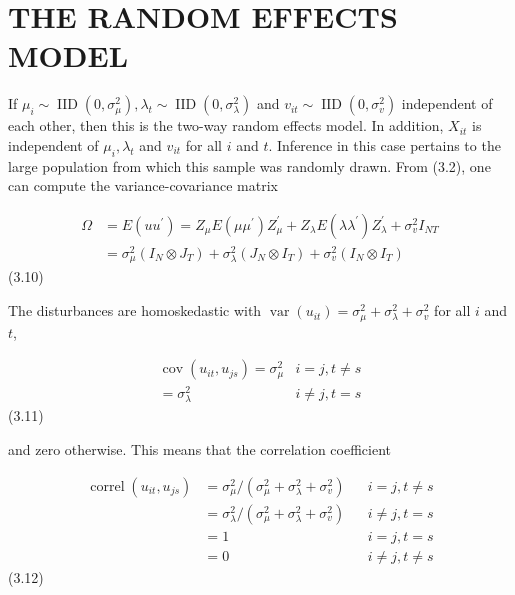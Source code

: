 \documentclass[
]{book}
\begin{document}
\hypertarget{the-random-effects-model-1}{%
\section{THE RANDOM EFFECTS MODEL}\label{the-random-effects-model-1}}

If \(\mu_{i} \sim \operatorname{IID}\left(0, \sigma_{\mu}^{2}\right), \lambda_{t} \sim \operatorname{IID}\left(0, \sigma_{\lambda}^{2}\right)\) and \(v_{i t} \sim \operatorname{IID}\left(0, \sigma_{v}^{2}\right)\) independent of each other, then this
is the two-way random effects model. In addition, \(X_{i t}\) is independent of \(\mu_{i}, \lambda_{t}\) and \(v_{i t}\) for all \(i\) and \(t\). Inference in this case pertains to the large population from which this sample was randomly drawn. From (3.2), one can compute the variance-covariance matrix

\begin{equation}
\begin{aligned}
\Omega &=E\left(u u^{\prime}\right)=Z_{\mu} E\left(\mu \mu^{\prime}\right) Z_{\mu}^{\prime}+Z_{\lambda} E\left(\lambda \lambda^{\prime}\right) Z_{\lambda}^{\prime}+\sigma_{v}^{2} I_{N T} \\
&=\sigma_{\mu}^{2}\left(I_{N} \otimes J_{T}\right)+\sigma_{\lambda}^{2}\left(J_{N} \otimes I_{T}\right)+\sigma_{v}^{2}\left(I_{N} \otimes I_{T}\right)
\end{aligned}
\end{equation} (3.10)

The disturbances are homoskedastic with \(\operatorname{var}\left(u_{i t}\right)=\sigma_{\mu}^{2}+\sigma_{\lambda}^{2}+\sigma_{v}^{2}\) for all \(i\) and \(t\),

\begin{equation}
\begin{array}{rl}
\operatorname{cov}\left(u_{i t}, u_{j s}\right)=\sigma_{\mu}^{2} & i=j, t \neq s \\
=\sigma_{\lambda}^{2} & i \neq j, t=s
\end{array}
\end{equation} (3.11)

and zero otherwise. This means that the correlation coefficient

\begin{equation}
\begin{aligned}
\operatorname{correl}\left(u_{i t}, u_{j s}\right) &=\sigma_{\mu}^{2} /\left(\sigma_{\mu}^{2}+\sigma_{\lambda}^{2}+\sigma_{v}^{2}\right) & & i=j, t \neq s \\
&=\sigma_{\lambda}^{2} /\left(\sigma_{\mu}^{2}+\sigma_{\lambda}^{2}+\sigma_{v}^{2}\right) & & i \neq j, t=s \\
&=1 & & i=j, t=s \\
&=0 & & i \neq j, t \neq s
\end{aligned}
\end{equation} (3.12)
\end{document}

